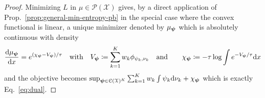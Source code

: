 \documentclass[11pt]{article}
\newcommand{\Cc}{\mathcal{C}}
\newcommand{\Pp}{\mathcal{P}}
\newcommand{\Xx}{\mathcal{X}}
\renewcommand{\d}{\mathrm{d}}
\begin{document}
\begin{proof}
{ Minimizing $L$ in $\mu \in \Pp(\Xx)$ gives, by a direct application of Prop.~\ref{prop:general-min-entropy-pb} in the special case where the convex functional is linear, a unique minimizer denoted by $\mu_{\boldsymbol{\psi}}$ which is absolutely continuous with density}
\begin{align}\label{eq:mu-from-psi}
\frac{\d \mu_\bpsi}{\d x} = e^{(\chi_\bpsi-V_\bpsi)/\tau}&&\text{with}&&V_\bpsi\coloneqq \sum_{k=1}^K w_k \phi_{\psi_k,\nu_k}&&\text{and}&& \quad\chi_\bpsi\coloneqq-\tau \log \int e^{-V_\bpsi/\tau}\d x
\end{align}
and the objective becomes
$
\sup_{\bpsi \in \Cc(\Xx)^K} \sum_{k=1}^K w_k \int  \psi_k\d\nu_k + \chi_\bpsi
$
which is exactly Eq.~\eqref{eq:dual}.




\end{proof}
\end{document}
